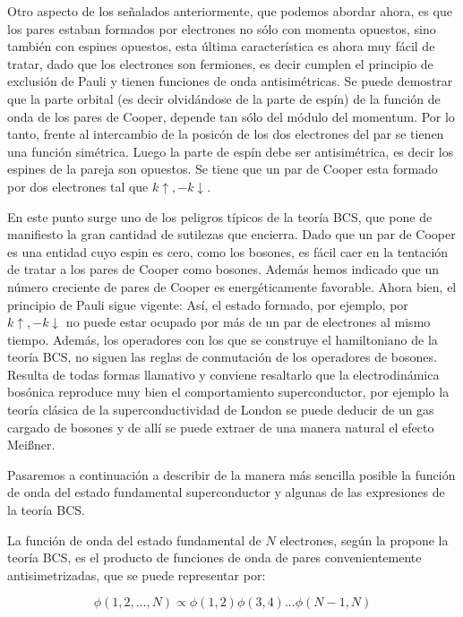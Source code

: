 Otro aspecto de los señalados anteriormente, que podemos abordar ahora, es que los pares estaban formados por electrones no sólo con momenta opuestos, sino también con espines opuestos, esta última característica es ahora muy fácil de tratar, dado que los electrones son fermiones, es decir cumplen el principio de exclusión de Pauli y tienen funciones de onda antisimétricas. Se puede demostrar que la parte orbital (es decir olvidándose de la parte de espín) de la función de onda de los pares de Cooper, depende tan sólo del módulo del momentum. Por lo tanto, frente al intercambio de la posicón de los dos electrones del par se tienen una función simétrica. Luego la parte de espín debe ser antisimétrica, es decir los espines de la pareja son opuestos. Se tiene que un par de Cooper esta formado por dos electrones tal que $k \uparrow, -k \downarrow$.

En este punto surge uno de los peligros típicos de la teoría BCS, que pone de manifiesto la gran cantidad de sutilezas que encierra. Dado que un par de Cooper es una entidad cuyo espin es cero, como los bosones, es fácil caer en la tentación de tratar a los pares de Cooper como bosones. Además hemos indicado que un número creciente de pares de Cooper es energéticamente favorable. Ahora bien, el principio de Pauli sigue vigente: Así, el estado formado, por ejemplo, por $k \uparrow, -k \downarrow$ no puede estar ocupado por más de un par de electrones al mismo tiempo. Además, los operadores con los que se construye el hamiltoniano de la teoría BCS, no siguen las reglas de conmutación de los operadores de bosones. Resulta de todas formas llamativo y conviene resaltarlo que la electrodinámica bosónica reproduce muy bien el comportamiento superconductor, por ejemplo la teoría clásica de la superconductividad de London se puede deducir de un gas cargado de bosones y de allí se puede extraer de una manera natural el efecto Meißner.

Pasaremos a continuación a describir de la manera más sencilla posible la función de onda del estado fundamental superconductor y algunas de las expresiones de la teoría BCS.

La función de onda del estado fundamental de $N$ electrones, según la propone la teoría BCS, es el producto de funciones de onda de pares convenientemente antisimetrizadas, que se puede representar por:

\begin{equation}
    \phi(1,2,...,N) \propto \phi(1,2)\phi(3,4)...\phi(N-1,N)
\end{equation}


